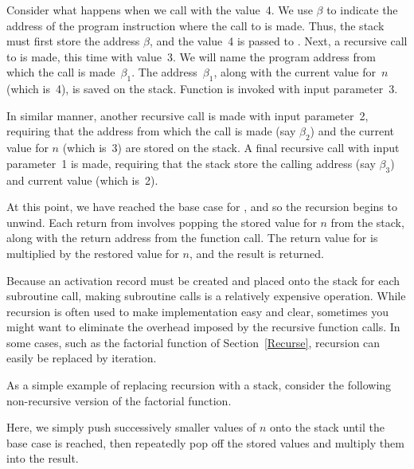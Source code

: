 Consider what happens when we call  with the value~4.
We use \(\beta\) to indicate the address of the program instruction
where the call to  is made.
Thus, the stack must first store the address \(\beta\), and the
value~4 is passed to .
Next, a recursive call to  is made, this time with value~3.
We will name the program address from which the call is
made~\(\beta_1\).
The address~\(\beta_1\), along with the current value for~\(n\)
(which is~4), is saved on the stack.
Function  is invoked with input parameter~3.

In similar manner, another recursive call is made with input
parameter~2, requiring that the address from which the call is made
(say \(\beta_2\)) and the current value for \(n\) (which is~3) are
stored on the stack.
A final recursive call with input parameter~1 is made, requiring that
the stack store the calling address (say \(\beta_3\)) and current
value (which is~2).

At this point, we have reached the base case for , and so
the recursion begins to unwind.
Each return from  involves popping the stored value for
\(n\) from the stack, along with the return address from the function
call.
The return value for  is multiplied by the restored value
for \(n\), and the result is returned.

Because an activation record must be created and placed onto the stack
for each subroutine call, making subroutine calls is a relatively
expensive operation. 
While recursion is often used to make implementation easy and clear,
sometimes you might want to eliminate the overhead imposed by the
recursive function calls.
In some cases, such as the factorial
function of Section~\ref{Recurse},
recursion can easily be replaced by iteration.

\begin{example}
\label{StackFact}
As a simple example of replacing recursion with a stack, consider the
following non-recursive version of the factorial
function.

\vspace{-\medskipamount}


\noindent Here, we simply push successively smaller values of $n$ onto
the stack until the base case is reached, then repeatedly pop off the
stored values and multiply them into the result.
\end{example}

